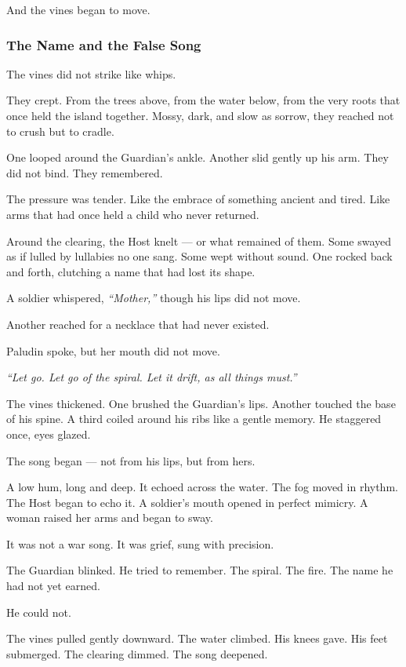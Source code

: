\documentclass[12pt]{article}
\begin{document}
And the vines began to move.

\dotfill

\subsubsection*{The Name and the False Song}

The vines did not strike like whips.

They crept. From the trees above, from the water below, from the very roots that once held the island together. Mossy, dark, and slow as sorrow, they reached not to crush but to cradle.

One looped around the Guardian’s ankle. Another slid gently up his arm. They did not bind. They remembered.

The pressure was tender. Like the embrace of something ancient and tired. Like arms that had once held a child who never returned.

Around the clearing, the Host knelt — or what remained of them. Some swayed as if lulled by lullabies no one sang. Some wept without sound. One rocked back and forth, clutching a name that had lost its shape.

A soldier whispered, \textit{“Mother,”} though his lips did not move.

Another reached for a necklace that had never existed.

Paludin spoke, but her mouth did not move.

\textit{``Let go. Let go of the spiral. Let it drift, as all things must.''}

The vines thickened. One brushed the Guardian’s lips. Another touched the base of his spine. A third coiled around his ribs like a gentle memory. He staggered once, eyes glazed.

The song began — not from his lips, but from hers.

A low hum, long and deep. It echoed across the water. The fog moved in rhythm. The Host began to echo it. A soldier’s mouth opened in perfect mimicry. A woman raised her arms and began to sway.

It was not a war song. It was grief, sung with precision.

The Guardian blinked. He tried to remember. The spiral. The fire. The name he had not yet earned.

He could not.

The vines pulled gently downward. The water climbed. His knees gave. His feet submerged. The clearing dimmed. The song deepened.
\end{document}
